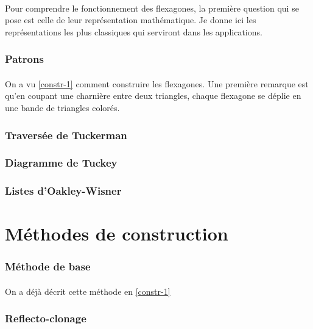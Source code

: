 \documentclass[10pt,a4paper]{article}
\begin{document}
		\paragraph{}Pour comprendre le fonctionnement des flexagones, la première question qui se pose est celle de leur représentation mathématique. Je donne ici les représentations les plus classiques qui serviront dans les applications.
		
		\subsubsection{Patrons}
			\paragraph{}On a vu \ref{constr-1} comment construire les flexagones. Une première remarque est qu'en coupant une charnière entre deux triangles, chaque flexagone se déplie en une bande de triangles colorés.
			
		\subsubsection{Traversée de Tuckerman}
		
		\subsubsection{Diagramme de Tuckey}
		
		\subsubsection{Listes d'Oakley-Wisner}


	\section{Méthodes de construction}
		\subsubsection{Méthode de base}
			\paragraph{}On a déjà décrit cette méthode en \ref{constr-1}
			
		\subsubsection{Reflecto-clonage}
\end{document}
